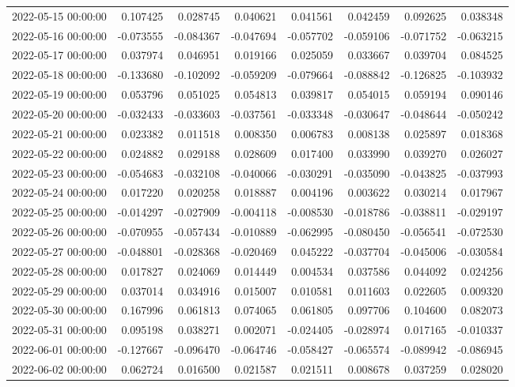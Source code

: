 \begin{tabular}{lrrrrrrr}
2022-05-15 00:00:00 & 0.107425 & 0.028745 & 0.040621 & 0.041561 & 0.042459 & 0.092625 & 0.038348 \\
2022-05-16 00:00:00 & -0.073555 & -0.084367 & -0.047694 & -0.057702 & -0.059106 & -0.071752 & -0.063215 \\
2022-05-17 00:00:00 & 0.037974 & 0.046951 & 0.019166 & 0.025059 & 0.033667 & 0.039704 & 0.084525 \\
2022-05-18 00:00:00 & -0.133680 & -0.102092 & -0.059209 & -0.079664 & -0.088842 & -0.126825 & -0.103932 \\
2022-05-19 00:00:00 & 0.053796 & 0.051025 & 0.054813 & 0.039817 & 0.054015 & 0.059194 & 0.090146 \\
2022-05-20 00:00:00 & -0.032433 & -0.033603 & -0.037561 & -0.033348 & -0.030647 & -0.048644 & -0.050242 \\
2022-05-21 00:00:00 & 0.023382 & 0.011518 & 0.008350 & 0.006783 & 0.008138 & 0.025897 & 0.018368 \\
2022-05-22 00:00:00 & 0.024882 & 0.029188 & 0.028609 & 0.017400 & 0.033990 & 0.039270 & 0.026027 \\
2022-05-23 00:00:00 & -0.054683 & -0.032108 & -0.040066 & -0.030291 & -0.035090 & -0.043825 & -0.037993 \\
2022-05-24 00:00:00 & 0.017220 & 0.020258 & 0.018887 & 0.004196 & 0.003622 & 0.030214 & 0.017967 \\
2022-05-25 00:00:00 & -0.014297 & -0.027909 & -0.004118 & -0.008530 & -0.018786 & -0.038811 & -0.029197 \\
2022-05-26 00:00:00 & -0.070955 & -0.057434 & -0.010889 & -0.062995 & -0.080450 & -0.056541 & -0.072530 \\
2022-05-27 00:00:00 & -0.048801 & -0.028368 & -0.020469 & 0.045222 & -0.037704 & -0.045006 & -0.030584 \\
2022-05-28 00:00:00 & 0.017827 & 0.024069 & 0.014449 & 0.004534 & 0.037586 & 0.044092 & 0.024256 \\
2022-05-29 00:00:00 & 0.037014 & 0.034916 & 0.015007 & 0.010581 & 0.011603 & 0.022605 & 0.009320 \\
2022-05-30 00:00:00 & 0.167996 & 0.061813 & 0.074065 & 0.061805 & 0.097706 & 0.104600 & 0.082073 \\
2022-05-31 00:00:00 & 0.095198 & 0.038271 & 0.002071 & -0.024405 & -0.028974 & 0.017165 & -0.010337 \\
2022-06-01 00:00:00 & -0.127667 & -0.096470 & -0.064746 & -0.058427 & -0.065574 & -0.089942 & -0.086945 \\
2022-06-02 00:00:00 & 0.062724 & 0.016500 & 0.021587 & 0.021511 & 0.008678 & 0.037259 & 0.028020 \\

\end{tabular}
